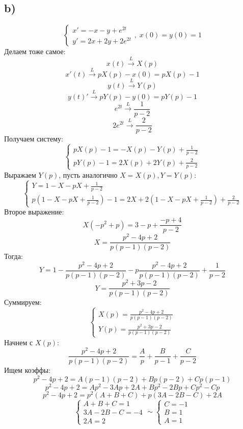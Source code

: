 \documentclass[a4paper,12pt]{article}
\begin{document}
\subsection*{b)}
\[
\begin{cases}
x' = -x - y+ e^{2t} \\
y' = 2x + 2y + 2e^{2t}
\end{cases}, \; x(0) = y(0) = 1
\]
Делаем тоже самое:
\[
x(t) \overset{L}{\rightarrow} X(p) 
\]
\[
x'(t) \overset{L}{\rightarrow} pX(p) - x(0) = pX(p) - 1
\]
\[
y(t) \overset{L}{\rightarrow} Y(p)
\]
\[
y(t)' \overset{L}{\rightarrow} pY(p) - y(0) = pY(p) - 1
\]
\[
e^{2t}\overset{L}{\rightarrow}  \frac{1}{p - 2}
\]
\[
2e^{2t}\overset{L}{\rightarrow}  \frac{2}{p - 2}
\]
Получаем систему:
\[
\begin{cases}
pX(p) - 1 = -X(p) - Y(p) + \frac{1}{p - 2}\\
pY(p) - 1 = 2X(p) + 2Y(p) + \frac{2}{p - 2}
\end{cases}
\]
Выражаем $Y(p)$, пусть аналогично $X = X(p), Y = Y(p)$:
\[
\begin{cases}
Y = 1 - X - pX + \frac{1}{p - 2} \\
p \left(1 - X - pX + \frac{1}{p - 2} \right) - 1 = 2X + 2\left(1 - X - pX + \frac{1}{p - 2} \right)+ \frac{2}{p - 2}
\end{cases}
\]
Второе выражение:
\[
X(-p^2 + p) = 3 - p + \frac{-p + 4}{p - 2}
\]
\[
X = \frac{p^2 - 4p + 2}{p(p-1)(p-2)}
\]
Тогда:
\[
Y = 1 -  \frac{p^2 - 4p + 2}{p(p-1)(p-2)} - p  \frac{p^2 - 4p + 2}{p(p-1)(p-2)} + \frac{1}{p-2}
\]
\[
Y  = \frac{p^2 + 3p -2}{p(p-1)(p-2)}
\]
Суммируем:
\[
\begin{cases}
X(p) = \frac{p^2 - 4p + 2}{p(p-1)(p-2)} \\
Y(p) = \frac{p^2 + 3p -2}{p(p-1)(p-2)}
\end{cases}
\]
Начнем с $X(p)$:
\[
 \frac{p^2 - 4p + 2}{p(p-1)(p-2)}  = \frac{A}{p} + \frac{B}{p - 1} + \frac{C}{p-2} 
\]
Ищем коэффы:
\[
p^2 -4p + 2 = A(p-1)(p-2) + Bp(p-2) + Cp(p-1)
\]
\[
p^2 - 4p +2 = A p^2 - 3 A p + 2 A + B p^2 - 2 B p + C p^2 - C p
\]
\[
p^2 - 4p +2 = p^2(A + B + C) + p(3A - 2B - C) + 2A
\]
\[
\begin{cases}
A + B + C = 1 \\
3A -2B - C = -4 \\
2A =2
\end{cases} \sim 
\begin{cases}
C = -1 \\
B = 1\\
A = 1
\end{cases} 
\]
\end{document}
